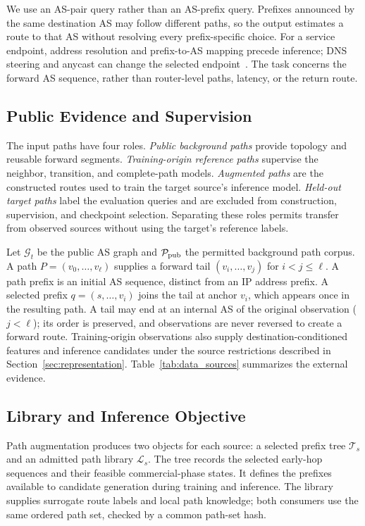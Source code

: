 \documentclass[conference]{IEEEtran}
\begin{document}
We use an AS-pair query rather than an AS-prefix query. Prefixes
announced by the same destination AS may follow different paths, so
the output estimates a route to that AS without resolving every
prefix-specific choice. For a service endpoint, address resolution and
prefix-to-AS mapping precede inference; DNS steering and anycast can
change the selected endpoint~\cite{schomp2020akamai,koch2021anycast}.
The task concerns the forward AS sequence, rather than router-level
paths, latency, or the return route.

\subsection{Public Evidence and Supervision}

The input paths have four roles. \emph{Public background paths} provide
topology and reusable forward segments. \emph{Training-origin reference
paths} supervise the neighbor, transition, and complete-path models.
\emph{Augmented paths} are the constructed routes used to train the
target source's inference model. \emph{Held-out target paths} label the
evaluation queries and are excluded from construction, supervision,
and checkpoint selection. Separating these roles permits transfer from
observed sources without using the target's reference labels.

Let $\mathcal G_t$ be the public AS graph and $\mathcal P_{\rm pub}$ the
permitted background path corpus. A path $P=(v_0,\ldots,v_\ell)$ supplies
a forward tail $(v_i,\ldots,v_j)$ for $i<j\leq\ell$.
A path prefix is an initial AS sequence, distinct from an IP address
prefix. A selected prefix $q=(s,\ldots,v_i)$ joins the tail at anchor $v_i$,
which appears once in the resulting path. A tail may end at an internal
AS of the original observation ($j<\ell$); its order is preserved, and
observations are never reversed to create a forward route.
Training-origin observations also supply destination-conditioned
features and inference candidates under the source restrictions
described in Section~\ref{sec:representation}.
Table~\ref{tab:data_sources} summarizes the external evidence.



\subsection{Library and Inference Objective}

Path augmentation produces two objects for each source: a selected
prefix tree $\mathcal T_s$ and an admitted path library $\mathcal L_s$.
The tree records the selected early-hop sequences and their feasible
commercial-phase states. It defines the prefixes available to candidate
generation during training and inference. The library supplies
surrogate route labels and local path knowledge; both consumers use
the same ordered path set, checked by a common path-set hash.
\end{document}
